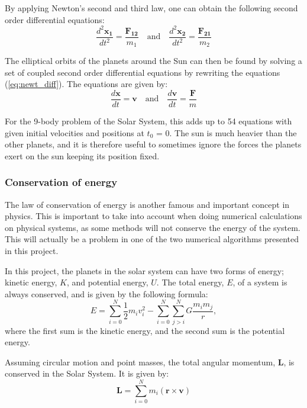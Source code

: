 \documentclass[10pt,a4paper,titlepage]{article}
\begin{document}
By applying Newton's second and third law, one can obtain the following second order differential equations:
\begin{equation}
\label{eq:newt_diff}
\frac{d^2\mathbf{x_1}}{dt^2} = \frac{\mathbf{F_{12}}}{m_1} \quad \mathrm{and} \quad \frac{d^2\mathbf{x_2}}{dt^2} = \frac{\mathbf{F_{21}}}{m_2}
\end{equation}

The elliptical orbits of the planets around the Sun can then be found by solving a set of coupled second order differential equations by rewriting the equations (\ref{eq:newt_diff}). The equations are given by:
\begin{equation}
\frac{d\mathbf{x}}{dt}=\mathbf{v} \quad  \mathrm{and} \quad \frac{d\mathbf{v}}{dt}=\frac{\mathbf{F}}{m}
\end{equation}

For the 9-body problem of the Solar System, this adds up to 54 equations with given initial velocities and positions at $t_0$ = 0. The sun is much heavier than the other planets, and it is therefore useful to sometimes ignore the forces the planets exert on the sun keeping its position fixed. 

\subsubsection{Conservation of energy}
The law of conservation of energy is another famous and important concept in physics. This is important to take into account when doing numerical calculations on physical systems, as some methods will not conserve the energy of the system. This will actually be a problem in one of the two numerical algorithms presented in this project. 

In this project, the planets in the solar system can have two forms of energy; kinetic energy, $K$, and potential energy, $U$. The total energy, $E$, of a system is always conserved, and is given by the following formula:
\begin{equation}
\label{eq:totalE}
E = \sum_{i=0}^{N}\frac{1}{2}m_i v_i^2-\sum_{i=0}^{N}\sum_{j>i}^{N}G\frac{m_im_j}{r},
\end{equation}
where the first sum is the kinetic energy, and the second sum is the potential energy. 

Assuming circular motion and point masses, the total angular momentum, $\mathbf{L}$, is conserved in the Solar System. It is given by:
\begin{equation}
\mathbf{L}=\sum_{i=0}^{N}m_{i}(\mathbf{r}\times\mathbf{v})
\end{equation}
\end{document}
